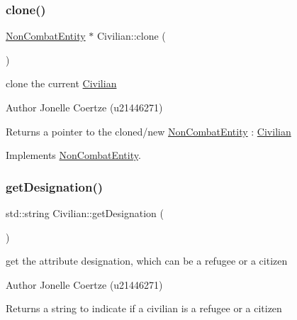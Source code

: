 \subsubsection{\texorpdfstring{clone()}{clone()}}
{\footnotesize\ttfamily \mbox{\hyperlink{class_non_combat_entity}{Non\+Combat\+Entity}} $\ast$ Civilian\+::clone (\begin{DoxyParamCaption}{ }\end{DoxyParamCaption})\hspace{0.3cm}{\ttfamily [virtual]}}



clone the current \mbox{\hyperlink{class_civilian}{Civilian}} 

\begin{DoxyAuthor}{Author}
Jonelle Coertze (u21446271) 
\end{DoxyAuthor}
\begin{DoxyReturn}{Returns}
a pointer to the cloned/new \mbox{\hyperlink{class_non_combat_entity}{Non\+Combat\+Entity}} \+: \mbox{\hyperlink{class_civilian}{Civilian}} 
\end{DoxyReturn}


Implements \mbox{\hyperlink{class_non_combat_entity_a4d6e9ad6c7682a10e2e491cac30fd0c0}{Non\+Combat\+Entity}}.

\mbox{\label{class_civilian_a416c38216315bd058dffbfb5b33d2795}} 
\subsubsection{\texorpdfstring{getDesignation()}{getDesignation()}}
{\footnotesize\ttfamily std\+::string Civilian\+::get\+Designation (\begin{DoxyParamCaption}{ }\end{DoxyParamCaption})}



get the attribute designation, which can be a refugee or a citizen 

\begin{DoxyAuthor}{Author}
Jonelle Coertze (u21446271) 
\end{DoxyAuthor}
\begin{DoxyReturn}{Returns}
a string to indicate if a civilian is a refugee or a citizen 
\end{DoxyReturn}
\mbox{\label{class_civilian_a8a1a50e95c21a3badd8dfa3ea9945246}} 
